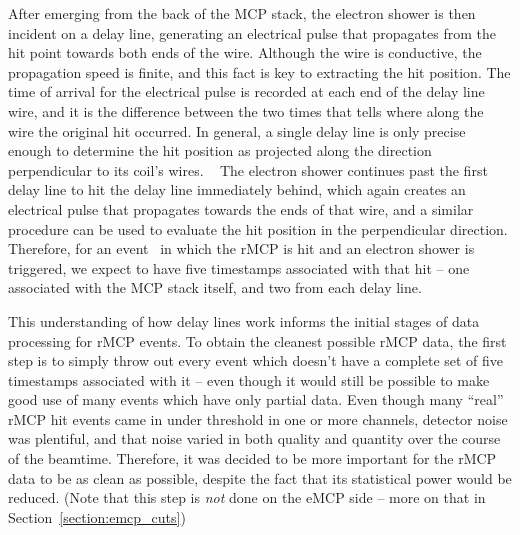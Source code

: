 After emerging from the back of the \ac{MCP} stack, the electron shower is then incident on a delay line, generating an electrical pulse that propagates from the hit point towards both ends of the wire.  Although the wire is conductive, the propagation speed is finite, and this fact is key to extracting the hit position.  The time of arrival for the electrical pulse is recorded at each end of the delay line wire, and it is the difference between the two times that tells where along the wire the original hit occurred.  In general, a single delay line is only precise enough to determine the hit position as projected along the direction perpendicular to its coil's wires.
~ 
The electron shower continues past the first delay line to hit the delay line immediately behind, which again creates an electrical pulse that propagates towards the ends of that wire, and a similar procedure can be used to evaluate the hit position in the perpendicular direction.  Therefore, for an event~ in which the rMCP is hit and an electron shower is triggered, we expect to have five timestamps associated with that hit -- one associated with the MCP stack itself, and two from each delay line.

This understanding of how delay lines work informs the initial stages of data processing for rMCP events.  To obtain the cleanest possible rMCP data, the first step is to simply throw out every event which doesn't have a complete set of five timestamps associated with it -- even though it would still be possible to make good use of many events which have only partial data.  Even though many ``real'' rMCP hit events came in under threshold in one or more channels, detector noise was plentiful, 
and that noise varied in both quality and quantity over the course of the beamtime.  Therefore, it was decided to be more important for the rMCP data to be as clean as possible, despite the fact that its statistical power would be reduced. (Note that this step is \emph{not} done on the eMCP side -- more on that in Section~\ref{section:emcp_cuts})~  


